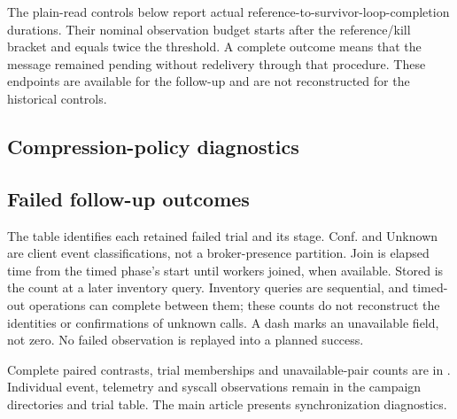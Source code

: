 \documentclass[11pt]{article}
\theoremstyle{definition}
\newcommand{\artifact}[1]{\texttt{\path{#1}}}
\begin{document}
The plain-read controls below report actual reference-to-survivor-loop-completion durations. Their nominal observation budget starts after the reference/kill bracket and equals twice the threshold. A complete outcome means that the message remained pending without redelivery through that procedure. These endpoints are available for the follow-up and are not reconstructed for the historical controls.
\begingroup\small

\endgroup

\subsection{Compression-policy diagnostics}
\begin{table}[!ht]
\centering\footnotesize\setlength{\tabcolsep}{3pt}

\caption{Current always-profile compression-policy sensitivity at sixteen publishers: equal-weight deployment means and ranges. Filler is the original compressible payload; Template is the fixed pseudorandom bank. Off/inherited is a matched throughput ratio; $n_i/n_o/n_p$ counts complete inherited/off trials/paired comparisons, each out of three. Both policies use the same Btrfs filesystem and NVMe device.}
\label{tab:followup-compression}
\end{table}

\FloatBarrier

\subsection{Failed follow-up outcomes}
The table identifies each retained failed trial and its stage. Conf. and Unknown are client event classifications, not a broker-presence partition. Join is elapsed time from the timed phase's start until workers joined, when available. Stored is the count at a later inventory query. Inventory queries are sequential, and timed-out operations can complete between them; these counts do not reconstruct the identities or confirmations of unknown calls. A dash marks an unavailable field, not zero. No failed observation is replayed into a planned success.
\begingroup\footnotesize\setlength{\tabcolsep}{3pt}

\endgroup

Complete paired contrasts, trial memberships and unavailable-pair counts are in \artifact{followup/derived/statistics.json}. Individual event, telemetry and syscall observations remain in the campaign directories and trial table. The main article presents synchronization diagnostics.
\FloatBarrier
\begingroup\raggedright


\endgroup
\end{document}
